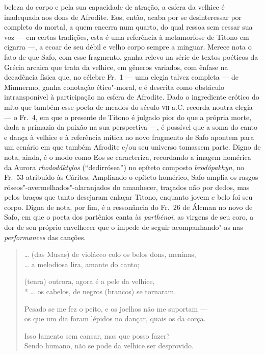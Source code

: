 {beleza do corpo e pela sua capacidade de atração, a esfera da velhice é
inadequada aos dons de Afrodite. Eos, então, acaba por se desinteressar por
completo do mortal, a quem encerra num quarto, do qual ressoa sem cessar sua
voz --- em certas tradições, esta é uma referência à metamorfose de Titono em
cigarra ---, a ecoar de seu débil e velho corpo sempre a minguar. Merece nota o fato de
que Safo, com esse fragmento, ganha relevo na série de textos poéticos da
Grécia arcaica que trata da velhice, em gêneros variados, com ênfase na
decadência física que, no célebre Fr.~1 --- uma elegia talvez completa --- de
Mimnermo, ganha conotação ético"-moral, e é descrita como obstáculo
intransponível à participação na esfera de Afrodite.
Dado o ingrediente erótico do mito que também esse poeta de meados do século
\textsc{vii} a.C. recorda noutra elegia --- o Fr.~4, em que o presente de Titono é
julgado pior do que a própria morte, dada a primazia da paixão na sua perspectiva
---, é possível que a soma do canto e dança à
velhice e à referência mítica no novo fragmento de Safo apontem para um cenário
em que também Afrodite e/ou seu universo tomassem parte. Digno de nota, ainda,
é o modo como Eos se caracteriza, recordando a imagem homérica da Aurora
\textit{rhododáktylos} (``dedirrósea'') no
epíteto composto \textit{brodópakhyn}, no Fr.~53 atribuído às Cárites.
Ampliando o epíteto homérico, Safo amplia os rasgos
róseos"-avermelhados"-alaranjados do amanhecer, traçados não por dedos, mas pelos
braços que tanto desejaram enlaçar Titono, enquanto jovem e belo foi seu
corpo. Digna de nota, por fim, é a ressonância do Fr.~26 de Álcman no novo de Safo, em que o poeta dos partênios canta às \textit{parthénoi}, as virgens de seu coro, a dor de seu próprio envelhecer que o impede de seguir acompanhando"-as nas \textit{performances} das canções.


\begin{verse}
\ldots{} (das Musas) de violáceo colo os belos dons, \qb{}meninas,\\
\ldots{} a melodiosa lira, amante do canto;

(tenra) outrora, agora é a pele da velhice,\\*
\ldots{} os cabelos, de negros (brancos) se tornaram.


Pesado se me fez o peito, e os joelhos não me \qb{}suportam --- \\
os que um dia foram lépidos no dançar, quais os \qb{}da corça.

Isso lamento sem cansar, mas que posso fazer?\\
Sendo humano, não se pode da velhice ser \qb{}desprovido.


\end{verse}}
